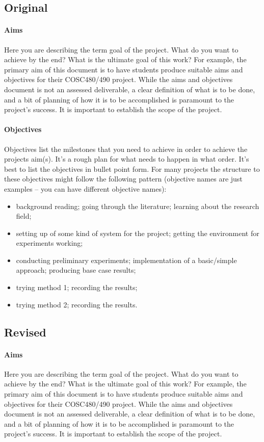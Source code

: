 \documentclass[12pt]{article}
\begin{document}
\subsection*{Original}

\paragraph{Aims}
Here you are describing the term goal of the project. What do you want to achieve by the end?  What is the ultimate goal of this work?  For example, the primary aim of this document is to have students produce suitable aims and objectives for their COSC480/490 project. While the aims and objectives document is not an assessed deliverable, a clear definition of what is to be done, and a bit of planning of how it is to be accomplished is paramount to the project's success. It is important to establish the scope of the project.

\paragraph{Objectives}
Objectives list the milestones that you need to achieve in order to achieve the projects aim(s). It's a rough plan for what needs to happen in what order. It's best to list the objectives in bullet point form. For many projects the structure to these objectives might follow the following pattern (objective names are just examples -- you can have different objective names):    
\begin{itemize}[noitemsep]
\item background reading; going through the literature; learning about the research field;
\item setting up of some kind of system for the project; getting the environment for experiments working;
\item conducting preliminary experiments; implementation of a basic/simple approach; producing base case results;
\item trying method 1; recording the results;
\item trying method 2; recording the results.
\end{itemize}

\subsection*{Revised}

\paragraph{Aims}
Here you are describing the term goal of the project. What do you want to achieve by the end?  What is the ultimate goal of this work?  For example, the primary aim of this document is to have students produce suitable aims and objectives for their COSC480/490 project. While the aims and objectives document is not an assessed deliverable, a clear definition of what is to be done, and a bit of planning of how it is to be accomplished is paramount to the project's success. It is important to establish the scope of the project.
\end{document}
